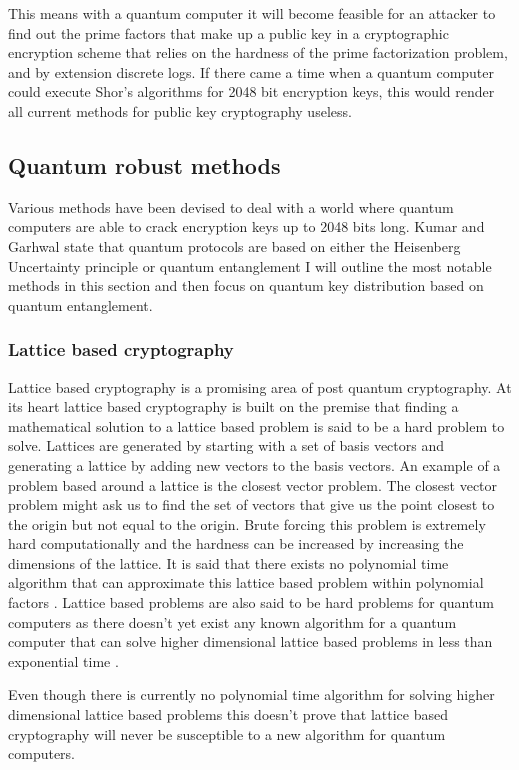 \documentclass{article}
\begin{document}
This means with a quantum computer it will become feasible for an attacker to find out the prime factors that make up a public key in a cryptographic encryption scheme that relies on the hardness of the prime factorization problem, and by extension discrete logs. If there came a time when a quantum computer could execute Shor's algorithms for 2048 bit encryption keys, this would render all current methods for public key cryptography useless.

\subsection{Quantum robust methods}
Various methods have been devised to deal with a world where quantum computers are able to crack encryption keys up to 2048 bits long. Kumar and Garhwal state that quantum protocols are based on either the Heisenberg Uncertainty principle or quantum entanglement \cite{Kumar2021State-of-the-ArtCryptography} I will outline the most notable methods in this section and then focus on quantum key distribution based on quantum entanglement. 

\subsubsection{Lattice based cryptography}
Lattice based cryptography is a promising area of post quantum cryptography. At its heart lattice based cryptography is built on the premise that finding a mathematical solution to a lattice based problem is said to be a hard problem to solve. Lattices are generated by starting with a set of basis vectors and generating a lattice by adding new vectors to the basis vectors. An example of a problem based around a lattice is the closest vector problem. The closest vector problem might ask us to find the set of vectors that give us the point closest to the origin but not equal to the origin. Brute forcing this problem is extremely hard computationally and the hardness can be increased by increasing the dimensions of the lattice. It is said that there exists no polynomial time algorithm that can approximate this lattice based problem within polynomial factors \cite{Micciancio2008Lattice-based}. Lattice based problems are also said to be hard problems for quantum computers as there doesn't yet exist any known algorithm for a quantum computer that can solve higher dimensional lattice based problems in less than exponential time \cite{Micciancio2008Lattice-based}.

Even though there is currently no polynomial time algorithm for solving higher dimensional lattice based problems this doesn't prove that lattice based cryptography will never be susceptible to a new algorithm for quantum computers.
\end{document}
